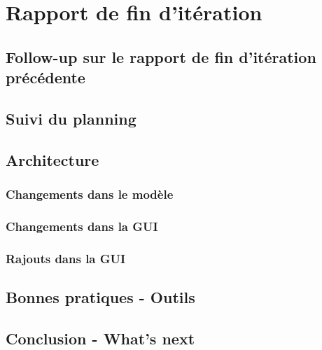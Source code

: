 \section{Rapport de fin d'itération}

\subsection{Follow-up sur le rapport de fin d'itération précédente}


\subsection{Suivi du planning}


\subsection{Architecture}
	
	\subsubsection{Changements dans le modèle}

	\subsubsection{Changements dans la GUI}

	\subsubsection{Rajouts dans la GUI}


\subsection{Bonnes pratiques - Outils}


\subsection{Conclusion - What's next}

